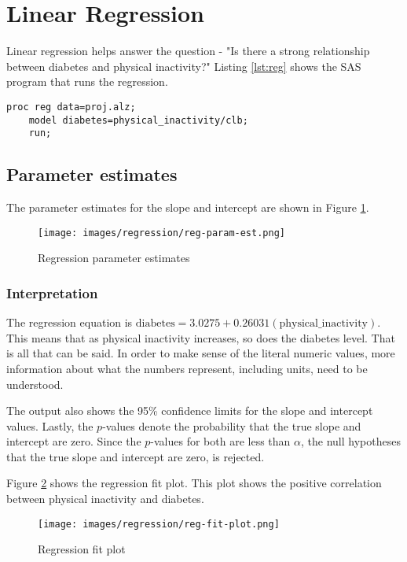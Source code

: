 \documentclass{article}
\begin{document}
\section{Linear Regression}
Linear regression helps answer the question - "Is there a strong relationship between diabetes and physical inactivity?" Listing \ref{lst:reg} shows the SAS program that runs the regression.

\begin{lstlisting}[language=SAS,caption=Linear regression SAS program variable,captionpos=b,label=lst:reg]
    proc reg data=proj.alz;
    model diabetes=physical_inactivity/clb;
    run;
\end{lstlisting}

\subsection{Parameter estimates}
The parameter estimates for the slope and intercept are shown in Figure \ref{fig:reg-param-est}.

\begin{figure}[ht]
    \centering
    \texttt{[image: images/regression/reg-param-est.png]}
    \caption{Regression parameter estimates}
    \label{fig:reg-param-est}
\end{figure}

\subsubsection{Interpretation}
The regression equation is \begin{math} \text{diabetes}=3.0275+0.26031(\text{physical\_inactivity}) \end{math}. This means that as physical inactivity increases, so does the diabetes level. That is all that can be said. In order to make sense of the literal numeric values, more information about what the numbers represent, including units, need to be understood. 

The output also shows the 95\% confidence limits for the slope and intercept values. Lastly, the $p$-values denote the probability that the true slope and intercept are zero. Since the $p$-values for both are less than $\alpha$, the null hypotheses that the true slope and intercept are zero, is rejected.

Figure \ref{fig:reg-fit-plot} shows the regression fit plot. This plot shows the positive correlation between physical inactivity and diabetes.

\begin{figure}[ht]
    \centering
    \texttt{[image: images/regression/reg-fit-plot.png]}
    \caption{Regression fit plot}
    \label{fig:reg-fit-plot}
\end{figure}
\end{document}
